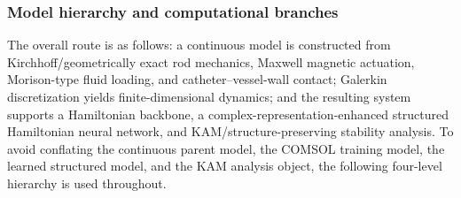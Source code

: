\subsubsection{Model hierarchy and computational branches}\label{sec:rod-1-1-1}

The overall route is as follows: a continuous model is constructed from Kirchhoff/geometrically exact rod mechanics, Maxwell magnetic actuation, Morison-type fluid loading, and catheter--vessel-wall contact; Galerkin discretization yields finite-dimensional dynamics; and the resulting system supports a Hamiltonian backbone, a complex-representation-enhanced structured Hamiltonian neural network, and KAM/structure-preserving stability analysis. To avoid conflating the continuous parent model, the COMSOL training model, the learned structured model, and the KAM analysis object, the following four-level hierarchy is used throughout.

